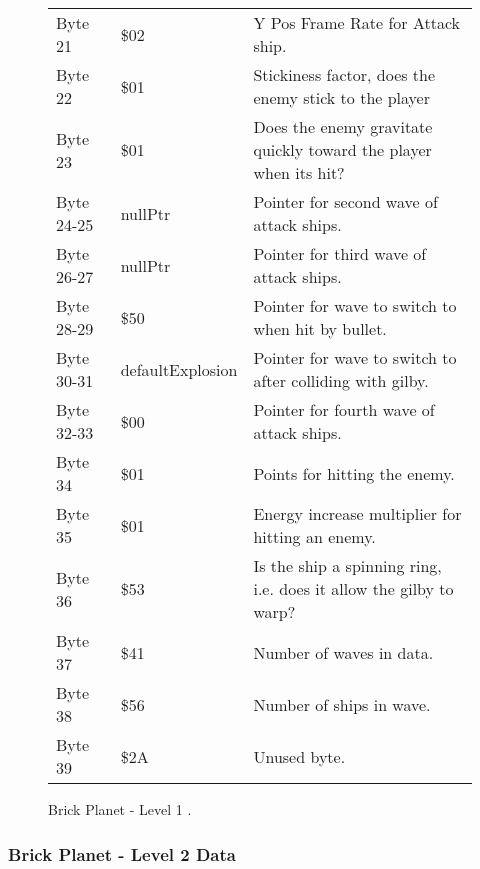 \begin{figure}[H]
{\begin{adjustbox}{width=12cm}
\begin{tabular}{lll}
 Byte 21    & \$02               & Y Pos Frame Rate for Attack ship.                                   \\
 Byte 22    & \$01               & Stickiness factor, does the enemy stick to the player               \\
 Byte 23    & \$01               & Does the enemy gravitate quickly toward the player when its hit?    \\
 Byte 24-25 & nullPtr           & Pointer for second wave of attack ships.                            \\
 Byte 26-27 & nullPtr           & Pointer for third wave of attack ships.                             \\
 Byte 28-29 & \$50               & Pointer for wave to switch to when hit by bullet.                   \\
 Byte 30-31 & defaultExplosion  & Pointer for  wave to switch to after colliding with gilby.          \\
 Byte 32-33 & \$00               & Pointer for fourth wave of attack ships.                            \\
 Byte 34    & \$01               & Points for hitting the enemy.                                       \\
 Byte 35    & \$01               & Energy increase multiplier for hitting an enemy.                    \\
 Byte 36    & \$53               & Is the ship a spinning ring, i.e. does it allow the gilby to warp?  \\
 Byte 37    & \$41               & Number of waves in data.                                            \\
 Byte 38    & \$56               & Number of ships in wave.                                            \\
 Byte 39    & \$2A               & Unused byte.                                                        \\
\bottomrule
\end{tabular}

  \end{adjustbox}

  }\caption*{Brick Planet - Level 1
.}
\end{figure}

\clearpage
\subsubsection{Brick Planet - Level 2 Data}

